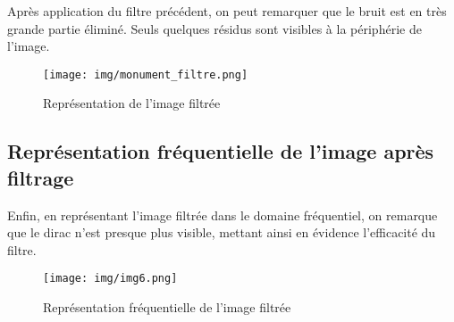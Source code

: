 \documentclass[11pt]{article}
\begin{document}
	Après application du filtre précédent, on peut remarquer que le bruit est en très grande partie éliminé. Seuls quelques résidus sont visibles à la périphérie de l'image.
	
	\begin{figure}[H]
			\centering
			\texttt{[image: img/monument\_filtre.png]}
			\caption{Représentation de l'image filtrée}
			\label{monument_filtre}
		\end{figure}


	\subsection{Représentation fréquentielle de l'image après filtrage}
	
	Enfin, en représentant l'image filtrée dans le domaine fréquentiel, on remarque que le dirac n'est presque plus visible, mettant ainsi en évidence l'efficacité du filtre.
	
	\begin{figure}[h]
			\centering
			\texttt{[image: img/img6.png]}
			\caption{Représentation fréquentielle de l'image filtrée}
			\label{img6}
		\end{figure}
\end{document}
